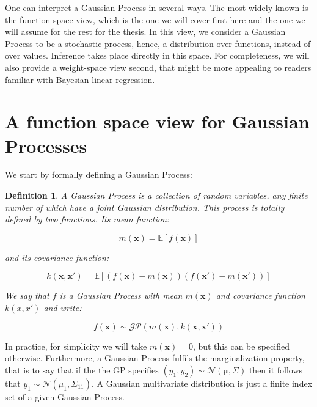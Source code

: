 \documentclass[10pt,a4paper,twoside]{book}
\newtheorem{defini}{Definition}
\begin{document}
One can interpret a Gaussian Process in several ways. The most widely known is the function space view, which is the one we will cover first here and the one we will assume for the rest for the thesis. In this view, we consider a Gaussian Process to be a stochastic process, hence, a distribution over functions, instead of over values. Inference takes place directly in this space. For completeness, we will also provide a weight-space view second, that might be more appealing to readers familiar with Bayesian linear regression.\\



\section{A function space view for Gaussian Processes}

We start by formally defining a Gaussian Process:

\begin{defini}
A Gaussian Process is a collection of random variables, any finite number of which have a joint Gaussian distribution. This process is totally defined by two functions. Its \textit{mean function}:

\begin{equation}
m(\boldsymbol{x}) = \mathbb{E}\left[f(\boldsymbol{x})\right]
\end{equation} 

and its \textit{covariance function}:

\begin{equation}
k(\boldsymbol{x}, \boldsymbol{x'}) = \mathbb{E}\left[\left( f(\boldsymbol{x}) - m(\boldsymbol{x}) \right)\left( f(\boldsymbol{x}') - m(\boldsymbol{x}')\right)\right]
\end{equation}


We say that $f$ is a Gaussian Process with mean $m(\boldsymbol{x})$ and covariance function $k(x, x')$ and write:

\begin{equation}
f(\boldsymbol{x}) \sim \mathcal{GP}\left(m(\boldsymbol{x}), k(\boldsymbol{x}, \boldsymbol{x'}) \right)
\end{equation}
\end{defini}

In practice, for simplicity we will take $m(\boldsymbol{x}) = 0$, but this can be specified otherwise. Furthermore, a Gaussian Process fulfils the marginalization property, that is to say that if the the GP specifies $(y_1, y_2) \sim \mathcal{N}(\boldsymbol{\mu}, \Sigma)$ then it follows that $y_1 \sim \mathcal{N}(\mu_1, \Sigma_{11})$. A Gaussian multivariate distribution is just a finite index set of a given Gaussian Process. \\
\end{document}
